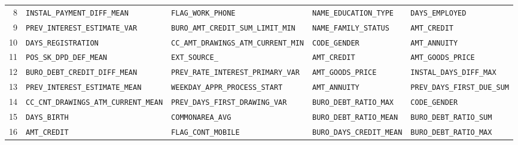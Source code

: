 \documentclass[final,5p,twocolumn]{elsarticle}
\begin{document}
\begin{table}[htbp]
\begin{threeparttable}
\begin{tabular}{@{}rL{40mm}L{40mm}L{40mm}L{40mm}@{}}
8 & \texttt{INSTAL\_\allowbreak PAYMENT\_\allowbreak DIFF\_\allowbreak MEAN} & \texttt{FLAG\_\allowbreak WORK\_\allowbreak PHONE} & \texttt{NAME\_\allowbreak EDUCATION\_\allowbreak TYPE} & \texttt{DAYS\_\allowbreak EMPLOYED} \\
9 & \texttt{PREV\_\allowbreak INTEREST\_\allowbreak ESTIMATE\_\allowbreak VAR} & \texttt{BURO\_\allowbreak AMT\_\allowbreak CREDIT\_\allowbreak SUM\_\allowbreak LIMIT\_\allowbreak MIN} & \texttt{NAME\_\allowbreak FAMILY\_\allowbreak STATUS} & \texttt{AMT\_\allowbreak CREDIT} \\
10 & \texttt{DAYS\_\allowbreak REGISTRATION} & \texttt{CC\_\allowbreak AMT\_\allowbreak DRAWINGS\_\allowbreak ATM\_\allowbreak CURRENT\_\allowbreak MIN} & \texttt{CODE\_\allowbreak GENDER} & \texttt{AMT\_\allowbreak ANNUITY} \\
11 & \texttt{POS\_\allowbreak SK\_\allowbreak DPD\_\allowbreak DEF\_\allowbreak MEAN} & \texttt{EXT\_\allowbreak SOURCE\_} & \texttt{AMT\_\allowbreak CREDIT} & \texttt{AMT\_\allowbreak GOODS\_\allowbreak PRICE} \\
12 & \texttt{BURO\_\allowbreak DEBT\_\allowbreak CREDIT\_\allowbreak DIFF\_\allowbreak MEAN} & \texttt{PREV\_\allowbreak RATE\_\allowbreak INTEREST\_\allowbreak PRIMARY\_\allowbreak VAR} & \texttt{AMT\_\allowbreak GOODS\_\allowbreak PRICE} & \texttt{INSTAL\_\allowbreak DAYS\_\allowbreak DIFF\_\allowbreak MAX} \\
13 & \texttt{PREV\_\allowbreak INTEREST\_\allowbreak ESTIMATE\_\allowbreak MEAN} & \texttt{WEEKDAY\_\allowbreak APPR\_\allowbreak PROCESS\_\allowbreak START} & \texttt{AMT\_\allowbreak ANNUITY} & \texttt{PREV\_\allowbreak DAYS\_\allowbreak FIRST\_\allowbreak DUE\_\allowbreak SUM} \\
14 & \texttt{CC\_\allowbreak CNT\_\allowbreak DRAWINGS\_\allowbreak ATM\_\allowbreak CURRENT\_\allowbreak MEAN} & \texttt{PREV\_\allowbreak DAYS\_\allowbreak FIRST\_\allowbreak DRAWING\_\allowbreak VAR} & \texttt{BURO\_\allowbreak DEBT\_\allowbreak RATIO\_\allowbreak MAX} & \texttt{CODE\_\allowbreak GENDER} \\
15 & \texttt{DAYS\_\allowbreak BIRTH} & \texttt{COMMONAREA\_\allowbreak AVG} & \texttt{BURO\_\allowbreak DEBT\_\allowbreak RATIO\_\allowbreak MEAN} & \texttt{BURO\_\allowbreak DEBT\_\allowbreak RATIO\_\allowbreak SUM} \\
16 & \texttt{AMT\_\allowbreak CREDIT} & \texttt{FLAG\_\allowbreak CONT\_\allowbreak MOBILE} & \texttt{BURO\_\allowbreak DAYS\_\allowbreak CREDIT\_\allowbreak MEAN} & \texttt{BURO\_\allowbreak DEBT\_\allowbreak RATIO\_\allowbreak MAX} \\

\end{tabular}
\end{threeparttable}
\end{table}
\end{document}
